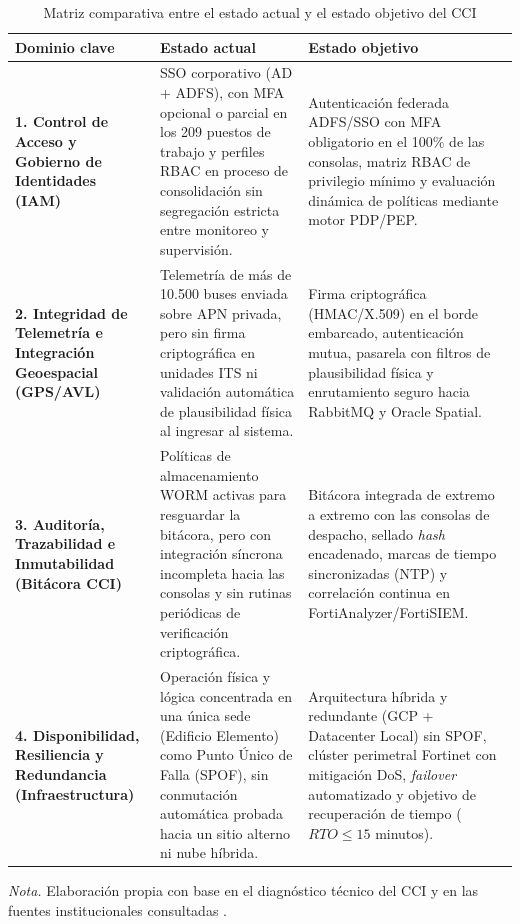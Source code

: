\begin{table}[H]
	\caption{Matriz comparativa entre el estado actual y el estado objetivo del CCI}
	\label{tab:matriz-brechas}
	\centering
	\footnotesize
	\renewcommand{\arraystretch}{1.15}
	\begin{tabularx}{\textwidth}{@{}>{\raggedright\arraybackslash}p{} Y Y@{}}
		\toprule
		\textbf{Dominio clave} & \textbf{Estado actual}                                                                                                                                                                                            & \textbf{Estado objetivo} \\
		\midrule
		\textbf{1. Control de Acceso y Gobierno de Identidades (IAM)}
		                       & SSO corporativo (AD + ADFS), con MFA opcional o parcial en los 209 puestos de trabajo y perfiles RBAC en proceso de consolidación sin segregación estricta entre monitoreo y supervisión.
		                       & Autenticación federada ADFS/SSO con MFA obligatorio en el 100\% de las consolas, matriz RBAC de privilegio mínimo y evaluación dinámica de políticas mediante motor PDP/PEP.
		\\
		\midrule
		\textbf{2. Integridad de Telemetría e Integración Geoespacial (GPS/AVL)}
		                       & Telemetría de más de 10.500 buses enviada sobre APN privada, pero sin firma criptográfica en unidades ITS ni validación automática de plausibilidad física al ingresar al sistema.
		                       & Firma criptográfica (HMAC/X.509) en el borde embarcado, autenticación mutua, pasarela con filtros de plausibilidad física y enrutamiento seguro hacia RabbitMQ y Oracle Spatial.
		\\
		\midrule
		\textbf{3. Auditoría, Trazabilidad e Inmutabilidad (Bitácora CCI)}
		                       & Políticas de almacenamiento WORM activas para resguardar la bitácora, pero con integración síncrona incompleta hacia las consolas y sin rutinas periódicas de verificación criptográfica.
		                       & Bitácora integrada de extremo a extremo con las consolas de despacho, sellado \textit{hash} encadenado, marcas de tiempo sincronizadas (NTP) y correlación continua en FortiAnalyzer/FortiSIEM.
		\\
		\midrule
		\textbf{4. Disponibilidad, Resiliencia y Redundancia (Infraestructura)}
		                       & Operación física y lógica concentrada en una única sede (Edificio Elemento) como Punto Único de Falla (SPOF), sin conmutación automática probada hacia un sitio alterno ni nube híbrida.
		                       & Arquitectura híbrida y redundante (GCP + Datacenter Local) sin SPOF, clúster perimetral Fortinet con mitigación DoS, \textit{failover} automatizado y objetivo de recuperación de tiempo ($RTO \leq 15$ minutos).
		\\
		\bottomrule
	\end{tabularx}

	\vspace{0.4em}
	\parbox{\textwidth}{\footnotesize \textit{Nota.} Elaboración propia con base en el diagnóstico técnico del CCI y en las fuentes institucionales consultadas \parencite{fase1cci2026,transmilenio2026cci,transmilenio2025res439}.}
\end{table}

